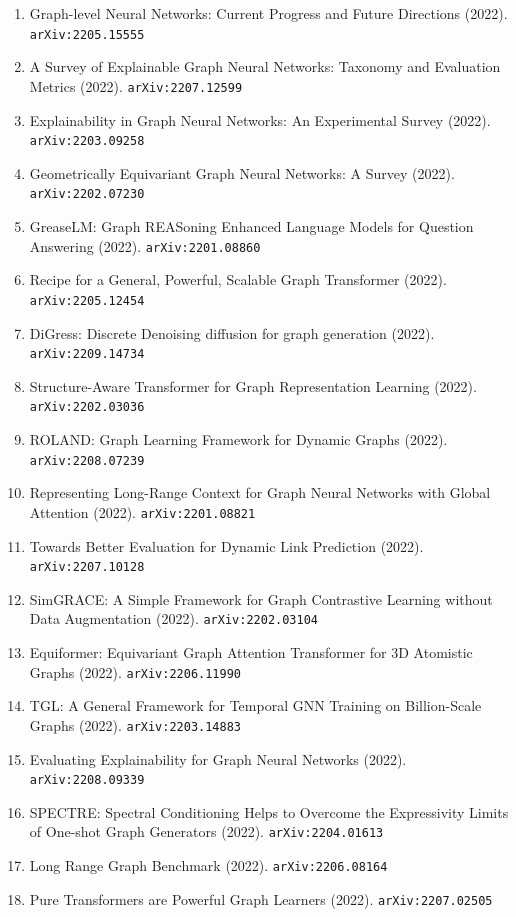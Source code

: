 \documentclass[11pt]{article}
\begin{document}
\begin{enumerate}
  classical physics (2021). \texttt{arXiv:2106.06610}
  \item Graph-level Neural Networks: Current Progress and Future Directions (2022). \texttt{arXiv:2205.15555}
  \item A Survey of Explainable Graph Neural Networks: Taxonomy and Evaluation
  Metrics (2022). \texttt{arXiv:2207.12599}
  \item Explainability in Graph Neural Networks: An Experimental Survey (2022). \texttt{arXiv:2203.09258}
  \item Geometrically Equivariant Graph Neural Networks: A Survey (2022). \texttt{arXiv:2202.07230}
  \item GreaseLM: Graph REASoning Enhanced Language Models for Question
  Answering (2022). \texttt{arXiv:2201.08860}
  \item Recipe for a General, Powerful, Scalable Graph Transformer (2022). \texttt{arXiv:2205.12454}
  \item DiGress: Discrete Denoising diffusion for graph generation (2022). \texttt{arXiv:2209.14734}
  \item Structure-Aware Transformer for Graph Representation Learning (2022). \texttt{arXiv:2202.03036}
  \item ROLAND: Graph Learning Framework for Dynamic Graphs (2022). \texttt{arXiv:2208.07239}
  \item Representing Long-Range Context for Graph Neural Networks with Global
  Attention (2022). \texttt{arXiv:2201.08821}
  \item Towards Better Evaluation for Dynamic Link Prediction (2022). \texttt{arXiv:2207.10128}
  \item SimGRACE: A Simple Framework for Graph Contrastive Learning without Data
  Augmentation (2022). \texttt{arXiv:2202.03104}
  \item Equiformer: Equivariant Graph Attention Transformer for 3D Atomistic
  Graphs (2022). \texttt{arXiv:2206.11990}
  \item TGL: A General Framework for Temporal GNN Training on Billion-Scale
  Graphs (2022). \texttt{arXiv:2203.14883}
  \item Evaluating Explainability for Graph Neural Networks (2022). \texttt{arXiv:2208.09339}
  \item SPECTRE: Spectral Conditioning Helps to Overcome the Expressivity Limits
  of One-shot Graph Generators (2022). \texttt{arXiv:2204.01613}
  \item Long Range Graph Benchmark (2022). \texttt{arXiv:2206.08164}
  \item Pure Transformers are Powerful Graph Learners (2022). \texttt{arXiv:2207.02505}

\end{enumerate}
\end{document}

